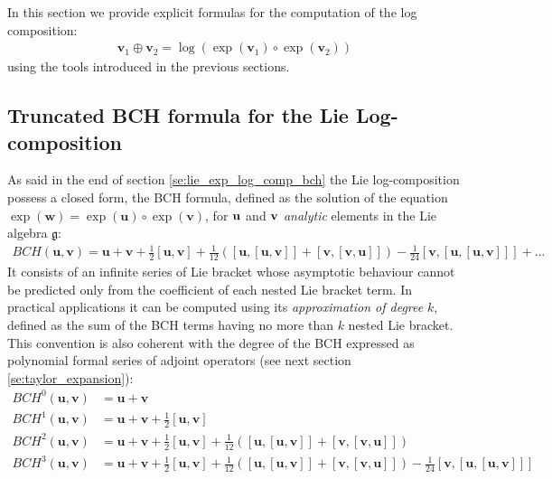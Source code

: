 In this section we provide explicit formulas for the computation of the log composition:
\begin{align}\label{eq:main_def_log_composition}
\mathbf{v}_{1}\oplus \mathbf{v}_{2} =  \log(\exp(\mathbf{v}_1)\circ \exp(\mathbf{v}_2))
\end{align}
using the tools introduced in the previous sections.

\subsection{Truncated BCH formula for the Lie Log-composition}\label{se:bch_formula}

As said in the end of section \ref{se:lie_exp_log_comp_bch} the Lie log-composition possess a closed form, the BCH formula, defined as the solution of the equation $\exp(\mathbf{w}) = \exp(\mathbf{u}) \circ \exp(\mathbf{v})$, for $\bf{u}$ and $\bf{v}$ \emph{analytic} elements in the Lie algebra $\mathfrak{g}$:
\begin{align}\label{eq:bch_definition}
	BCH(\mathbf{u},\mathbf{v}) 
	= 
	\mathbf{u} + \mathbf{v} + \frac{1}{2}[\mathbf{u},\mathbf{v}] + \frac{1}{12}([\mathbf{u},[\mathbf{u},\mathbf{v}]]
	+ [\mathbf{v},[\mathbf{v},\mathbf{u}]]) - \frac{1}{24}[\mathbf{v},[\mathbf{u},[\mathbf{u},\mathbf{v}]]] +... 
\end{align}
It consists of an infinite series of Lie bracket whose asymptotic behaviour cannot be predicted only from the coefficient of each nested Lie bracket term. In practical applications it can be computed using its \emph{approximation of degree} $k$, defined as the sum of the BCH terms having no more than $k$ nested Lie bracket. This convention is also coherent with the degree of the BCH expressed as polynomial formal series of adjoint operators (see next section \ref{se:taylor_expansion}):
\begin{align*}
BCH^{0}(\mathbf{u},\mathbf{v}) &= \mathbf{u} + \mathbf{v} \\
BCH^{1}(\mathbf{u},\mathbf{v}) &=  \mathbf{u} + \mathbf{v} + \frac{1}{2}[\mathbf{u},\mathbf{v}] \\
BCH^{2}(\mathbf{u},\mathbf{v}) &=  \mathbf{u} + \mathbf{v} + \frac{1}{2}[\mathbf{u},\mathbf{v}] + \frac{1}{12}([\mathbf{u},[\mathbf{u},\mathbf{v}]] + [\mathbf{v},[\mathbf{v},\mathbf{u}]]) \\
BCH^{3}(\mathbf{u},\mathbf{v}) &=  \mathbf{u} + \mathbf{v} + \frac{1}{2}[\mathbf{u},\mathbf{v}] + \frac{1}{12}([\mathbf{u},[\mathbf{u},\mathbf{v}]] + [\mathbf{v},[\mathbf{v},\mathbf{u}]])- \frac{1}{24}[\mathbf{v},[\mathbf{u},[\mathbf{u},\mathbf{v}]]] 
\end{align*}
